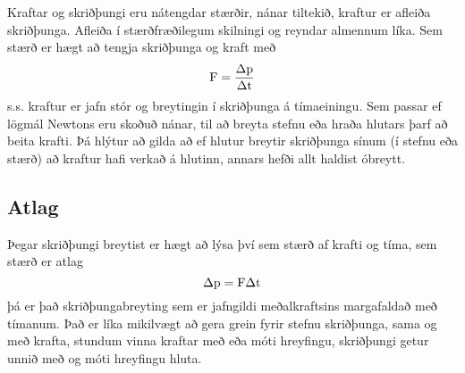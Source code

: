 %
Kraftar og skriðþungi eru nátengdar stærðir, nánar tiltekið, kraftur er afleiða
skriðþunga. Afleiða í stærðfræðilegum skilningi og reyndar almennum líka. Sem
stærð er hægt að tengja skriðþunga og kraft með
\begin{equation}
	\textrm{F} = \frac{\Delta\text{p}}{\Delta\textrm{t}}
\end{equation}
s.s. kraftur er jafn stór og breytingin í skriðþunga á tímaeiningu. Sem passar ef
lögmál Newtons eru skoðuð nánar, til að breyta stefnu eða hraða hlutars þarf
að beita krafti. Þá hlýtur að gilda að ef hlutur breytir skriðþunga 
sínum (í stefnu eða stærð) að kraftur hafi verkað á hlutinn, 
annars hefði allt haldist óbreytt.

\subsection{Atlag}
Þegar skriðþungi breytist er hægt að lýsa því sem stærð af krafti og tíma, sem
stærð er atlag
\begin{equation}
	\Delta\text{p} = \textrm{F} \Delta\textrm{t} 
\end{equation}
þá er það skriðþungabreyting sem er jafngildi meðalkraftsins margafaldað með
tímanum. Það er líka mikilvægt að gera grein fyrir stefnu skriðþunga, sama og
með krafta, stundum vinna kraftar með eða móti hreyfingu, skriðþungi getur unnið
með og móti hreyfingu hluta.

